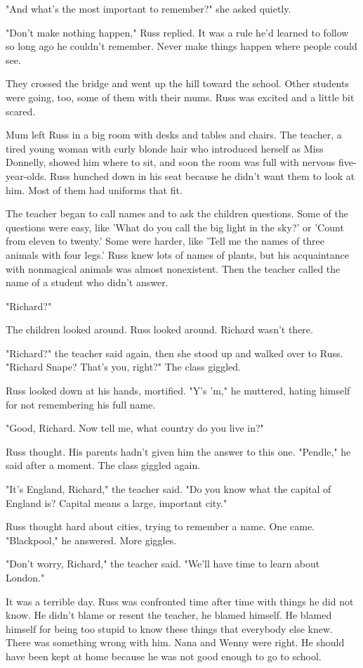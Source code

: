 \documentclass[a4paper,11pt]{article}
\begin{document}
"And what's the most important to remember?" she asked quietly.

"Don't make nothing happen," Russ replied. It was a rule he'd learned to follow so long ago he couldn't remember. Never make things happen where people could see.

They crossed the bridge and went up the hill toward the school. Other students were going, too, some of them with their mums. Russ was excited and a little bit scared.

Mum left Russ in a big room with desks and tables and chairs. The teacher, a tired young woman with curly blonde hair who introduced herself as Miss Donnelly, showed him where to sit, and soon the room was full with nervous five-year-olds. Russ hunched down in his seat because he didn't want them to look at him. Most of them had uniforms that fit.

The teacher began to call names and to ask the children questions. Some of the questions were easy, like 'What do you call the big light in the sky?' or 'Count from eleven to twenty.' Some were harder, like 'Tell me the names of three animals with four legs.' Russ knew lots of names of plants, but his acquaintance with nonmagical animals was almost nonexistent. Then the teacher called the name of a student who didn't answer.

"Richard?"

The children looked around. Russ looked around. Richard wasn't there.

"Richard?" the teacher said again, then she stood up and walked over to Russ. "Richard Snape? That's you, right?" The class giggled.

Russ looked down at his hands, mortified. "Y's 'm," he muttered, hating himself for not remembering his full name.

"Good, Richard. Now tell me, what country do you live in?"

Russ thought. His parents hadn't given him the answer to this one. "Pendle," he said after a moment. The class giggled again.

"It's England, Richard," the teacher said. "Do you know what the capital of England is? Capital means a large, important city."

Russ thought hard about cities, trying to remember a name. One came. "Blackpool," he answered. More giggles.

"Don't worry, Richard," the teacher said. "We'll have time to learn about London."

It was a terrible day. Russ was confronted time after time with things he did not know. He didn't blame or resent the teacher, he blamed himself. He blamed himself for being too stupid to know these things that everybody else knew. There was something wrong with him. Nana and Wenny were right. He should have been kept at home because he was not good enough to go to school.
\end{document}
